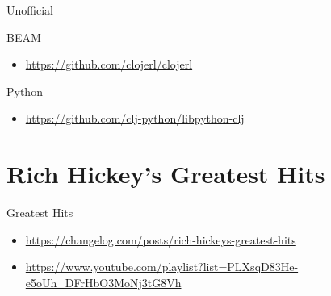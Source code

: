 \documentclass[bigger]{beamer}
\begin{document}
\begin{frame}[label={sec:org2ec837b}]{Unofficial}
\begin{block}{BEAM}
\begin{itemize}
\item \url{https://github.com/clojerl/clojerl}
\end{itemize}
\end{block}

\begin{block}{Python}
\begin{itemize}
\item \url{https://github.com/clj-python/libpython-clj}
\end{itemize}
\end{block}
\end{frame}

\section{Rich Hickey's Greatest Hits}
\label{sec:orgf312ec8}
\begin{frame}[label={sec:org363b6df}]{Greatest Hits}
\begin{itemize}
\item \url{https://changelog.com/posts/rich-hickeys-greatest-hits}
\item \url{https://www.youtube.com/playlist?list=PLXsqD83He-e5oUh\_DFrHbO3MoNj3tG8Vh}
\end{itemize}
\end{frame}
\end{document}
